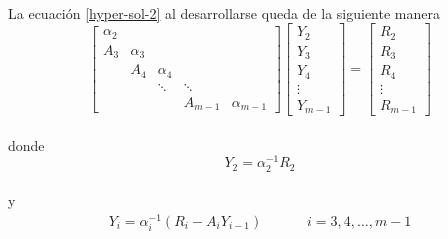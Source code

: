 \documentclass[letterpaper, openright, 12pt]{book}
\begin{document}
	\paragraph*{}
		La ecuación \ref{hyper-sol-2} al desarrollarse queda de la siguiente manera
		\begin{equation}
			\begin{bmatrix}
				\alpha_2\\
				A_3 & \alpha_3\\
				& A_4 & \alpha_4\\
				& & \ddots & \ddots\\
				& & & A_{m-1} & \alpha_{m-1}
			\end{bmatrix}
			\begin{bmatrix}
				Y_2\\
				Y_3\\
				Y_4\\
				\vdots\\
				Y_{m-1}
			\end{bmatrix}
			=
			\begin{bmatrix}
				R_2\\
				R_3\\
				R_4\\
				\vdots\\
				R_{m-1}
			\end{bmatrix}
		\end{equation}\\
		donde
		\begin{equation}
			Y_2 = \alpha_{2}^{-1} R_2
		\end{equation}\\
		y
		\begin{align}
			Y_i = \alpha_{i}^{-1} \left( R_i - A_i Y_{i-1} \right) &&&& i = 3, 4, \dots, m-1
		\end{align} 
		
\end{document}
